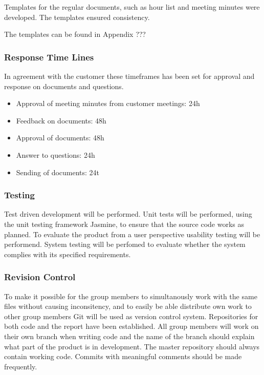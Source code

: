 Templates for the regular documents, such as hour list and meeting minutes were developed. The templates ensured consistency.

The templates can be found in Appendix ???

\subsubsection{Response Time Lines}

In agreement with the customer these timeframes has been set for approval and response on documents and questions.

\begin{itemize}
	\item Approval of meeting minutes from customer meetings: 24h
	\item Feedback on documents: 48h
	\item Approval of documents: 48h
	\item Answer to questions: 24h
	\item Sending of documents: 24t
\end{itemize}

\subsubsection{Testing}

Test driven development will be performed. Unit tests will be performed, using the unit testing framework Jasmine, to ensure that the source code works as planned. To evaluate the product from a user perspective usability testing will be performend. System testing will be perfomed to evaluate whether the system complies with its specified requirements.

\subsubsection{Revision Control}

To make it possible for the group members to simultanously work with the same files without causing inconsitency, and to easily be able distribute own work to other group members Git will be used as version control system. Repositories for both code and the report have been established. All group members will work on their own branch when writing code and the name of the branch should explain what part of the product is in development. The master repository should always contain working code. Commits with meaningful comments should be made frequently.

